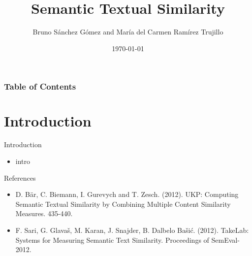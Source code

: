 \documentclass{beamer}
\title{Semantic Textual Similarity}
\author{Bruno Sánchez Gómez and María del Carmen Ramírez Trujillo}
\date{\today}
\begin{document}
\begin{frame}
    \titlepage
\end{frame}

\begin{frame}
    \frametitle{Table of Contents}
    \tableofcontents
\end{frame}

\section{Introduction}
\frame{\tableofcontents[currentsection]}
\begin{frame}{Introduction}
    \begin{itemize}
        \item intro
    \end{itemize}
\end{frame}



\begin{frame}{References}
    \begin{itemize}
        \item D. Bär, C. Biemann, I. Gurevych and T. Zesch. (2012). UKP: Computing Semantic Textual Similarity by Combining Multiple Content Similarity Measures. 435-440. 
        \item F. Sari, G. Glavaš, M. Karan, J. Snajder, B. Dalbelo Bašić. (2012). TakeLab: Systems for Measuring Semantic Text Similarity. Proceedings of SemEval-2012. 
    \end{itemize}    
\end{frame}
\end{document}
